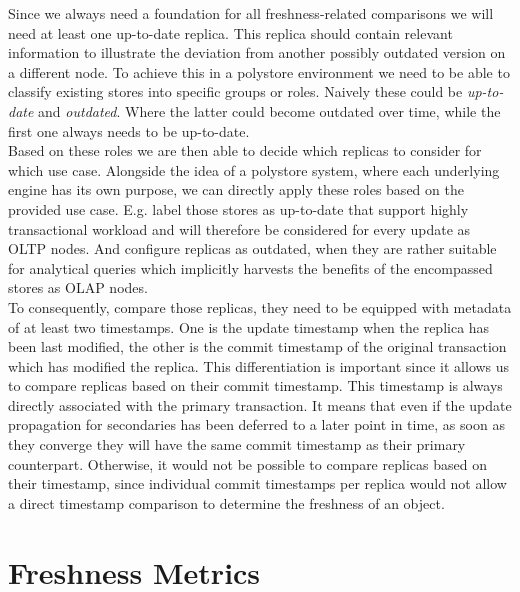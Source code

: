 Since we always need a foundation for all freshness-related comparisons we will need at least one up-to-date replica. 
This replica should contain relevant information to illustrate the deviation from another possibly outdated version on a different node.
To achieve this in a polystore environment we need to be able to classify existing stores into specific groups or roles.
Naively these could be \emph{up-to-date} and \emph{outdated}. Where the latter could become outdated over time, while the first one always needs to be up-to-date. \\
Based on these roles we are then able to decide which replicas to consider for which use case.
Alongside the idea of a polystore system, where each underlying engine has its own purpose, we can directly apply these roles 
based on the provided use case. E.g. label those stores as up-to-date that support highly transactional workload and will therefore be considered for every update as OLTP nodes.
And configure replicas as outdated, when they are rather suitable for analytical queries which implicitly harvests the benefits of the encompassed stores as OLAP nodes. \\

To consequently, compare those replicas, they need to be equipped with metadata of at least two timestamps. 
One is the update timestamp when the replica has been last modified,
the other is the commit timestamp of the original transaction which has modified the replica.
This differentiation is important since it allows us to compare replicas based on their commit timestamp. This timestamp is always directly associated with the primary transaction.
It means that even if the update propagation for secondaries has been deferred to a later point in time, as soon as they converge they will have the same commit timestamp 
as their primary counterpart.
Otherwise, it would not be possible to compare replicas based on their timestamp, since individual commit timestamps per replica would not allow a direct timestamp comparison 
to determine the freshness of an object.



\section{Freshness Metrics}
\label{sec:freshne_metrics}

